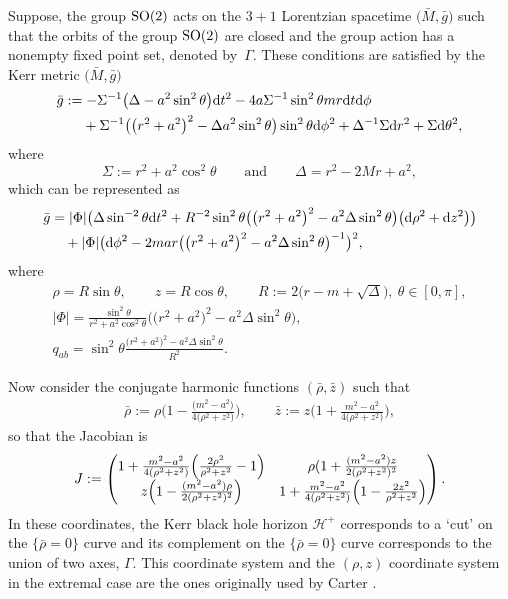 \documentclass[pdftex]{sigma}
\renewcommand{\r}{\rho}
\numberwithin{equation}{section}
\begin{document}
Suppose, the group ${\rm SO}(2)$ acts on the $3+1$ Lorentzian spacetime $\bigl(\bar{M}, \bar{g}\bigr)$ such that the orbits of the group ${\rm SO}(2)$ are closed and the group action has a nonempty fixed point set, denoted by~$\Gamma$. These conditions are satisfied by the Kerr metric $\bigl(\bar{M}, \bar{g}\bigr)$
\begin{align*}
&\bar{g}:= - \Sigma^{-1} \bigl(\Delta -a^2 \sin^2 \theta\bigr) {\rm d}t^2 - 4a\Sigma^{-1} \sin^{2} \theta mr {\rm d}t {\rm d}\phi \notag\\
&\hphantom{\bar{g} :=}{}+ \Sigma^{-1} \bigl(\bigl(r^2 +a^2\bigr)^2-\Delta a^2 \sin^2 \theta\bigr) \sin^2 \theta {\rm d}\phi^2 + \Delta^{-1} \Sigma {\rm d}r^2 + \Sigma {\rm d}\theta^2,
\end{align*}
where
\[
\Sigma := r^2 + a^2 \cos^2 \theta \qquad \text{and} \qquad \Delta = r^2-2Mr + a^2,
\]
which can be represented as
\begin{align*}
\bar{g} &{}= \vert \Phi \vert \bigl(\Delta \sin^{-2} \theta {\rm d}t^2 + R^{-2} \sin^2 \theta \bigl(\bigl(r^2 + a^2\bigr)^2- a^2 \Delta \sin^2 \theta\bigr) \bigl({\rm d} \rho^2 + {\rm d}z^2\bigr)\bigr) \\
&\quad{}+ \vert \Phi \vert \bigl({\rm d}\phi^2 - 2 mar \bigl(\bigl(r^2+a^2\bigr)^2 - a^2 \Delta \sin^2 \theta\bigr)^{-1}\bigr)^2,
\end{align*}
where
\begin{gather*}
\rho = R \sin \theta, \qquad z = R \cos \theta, \qquad R := 2 \bigl(r-m + \sqrt{\Delta}\bigr), \ \theta \in [0, \pi],
\\
	\vert \Phi \vert = \frac{\sin^2 \theta }{r^2 +a^2 \cos^2 \theta} \bigl( \bigl(r^2+a^2\bigr)^2 -a^2 \Delta \sin^2 \theta \bigr), \\
	q_{ab} = \sin^2 \theta \frac{ \bigl(r^2+a^2\bigr)^2 -a^2 \Delta \sin^2 \theta }{R^2}.
\end{gather*}


Now consider the conjugate harmonic functions $(\bar{\rho}, \bar{z})$ such that
\begin{align*}
\bar{\rho} := \rho \biggl(1- \frac{\bigl(m^2-a^2\bigr)}{4 \bigl(\rho^2 + z^2\bigr)}\biggr), \qquad \bar{z} := z \biggl(1+ \frac{m^2-a^2}{4 \bigl(\rho^2 + z^2\bigr)}\biggr),
\end{align*}
so that the Jacobian is
\begin{align*}
J := \begin{pmatrix} 1 + \frac{m^2-a^2}{4 (\r^2 + z^2)} \Bigl( \frac{2 \r^2}{ \r^2 +z^2} -1\Bigr) & \r (1 + \frac{(m^2-a^2)z}{2 (\r^2 +z^2)^2} \\
z \Bigl(1- \frac{ (m^2-a^2) \r}{ 2 (\r^2 + z^2)^2}\Bigr) & 1+ \frac{m^2-a^2}{4 (\r^2 +z^2)} \Bigl(1- \frac{2 z^2}{\r^2 +z^2} \Bigr)
\end{pmatrix}.
\end{align*}
In these coordinates, the Kerr black hole horizon $\mathcal{H}^+$ corresponds to a `cut' on the $\{ \bar{\rho} =0\}$ curve and its complement on the $\{\bar{\rho} =0\}$ curve corresponds to the union of two axes, $\Gamma$. This coordinate system and the $(\rho, z)$ coordinate system in the extremal case are the ones originally used by Carter \cite{Car_71}.
\end{document}
